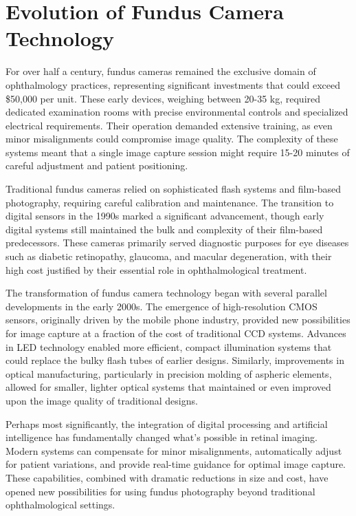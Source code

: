 \documentclass[
  Letterpaper,
]{scrbook}
\begin{document}
\section{Evolution of Fundus Camera
Technology}\label{evolution-of-fundus-camera-technology}

For over half a century, fundus cameras remained the exclusive domain of
ophthalmology practices, representing significant investments that could
exceed \$50,000 per unit. These early devices, weighing between 20-35
kg, required dedicated examination rooms with precise environmental
controls and specialized electrical requirements. Their operation
demanded extensive training, as even minor misalignments could
compromise image quality. The complexity of these systems meant that a
single image capture session might require 15-20 minutes of careful
adjustment and patient positioning.

Traditional fundus cameras relied on sophisticated flash systems and
film-based photography, requiring careful calibration and maintenance.
The transition to digital sensors in the 1990s marked a significant
advancement, though early digital systems still maintained the bulk and
complexity of their film-based predecessors. These cameras primarily
served diagnostic purposes for eye diseases such as diabetic
retinopathy, glaucoma, and macular degeneration, with their high cost
justified by their essential role in ophthalmological treatment.

The transformation of fundus camera technology began with several
parallel developments in the early 2000s. The emergence of
high-resolution CMOS sensors, originally driven by the mobile phone
industry, provided new possibilities for image capture at a fraction of
the cost of traditional CCD systems. Advances in LED technology enabled
more efficient, compact illumination systems that could replace the
bulky flash tubes of earlier designs. Similarly, improvements in optical
manufacturing, particularly in precision molding of aspheric elements,
allowed for smaller, lighter optical systems that maintained or even
improved upon the image quality of traditional designs.

Perhaps most significantly, the integration of digital processing and
artificial intelligence has fundamentally changed what's possible in
retinal imaging. Modern systems can compensate for minor misalignments,
automatically adjust for patient variations, and provide real-time
guidance for optimal image capture. These capabilities, combined with
dramatic reductions in size and cost, have opened new possibilities for
using fundus photography beyond traditional ophthalmological settings.
\end{document}
